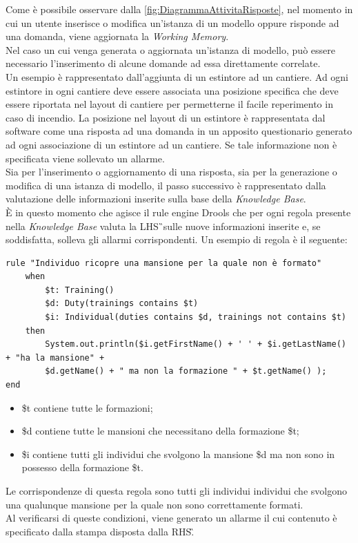Come è possibile osservare dalla \autoref{fig:DiagrammaAttivitaRisposte}, nel momento in cui un utente inserisce o modifica un'istanza di un modello oppure risponde ad una domanda, viene aggiornata la \textit{Working Memory}. \\
Nel caso un cui venga generata o aggiornata un'istanza di modello, può essere necessario l'inserimento di alcune domande ad essa direttamente correlate.\\
Un esempio è rappresentato dall'aggiunta di un estintore ad un cantiere. Ad ogni estintore in ogni cantiere deve essere associata una posizione specifica che deve essere riportata nel layout di cantiere per permetterne il facile reperimento in caso di incendio. La posizione nel layout di un estintore è rappresentata dal software come una risposta ad una domanda in un apposito questionario generato ad ogni associazione di un estintore ad un cantiere. Se tale informazione non è specificata viene sollevato un allarme.\\
Sia per l'inserimento o aggiornamento di una risposta, sia per la generazione o modifica di una istanza di modello, il passo successivo è rappresentato dalla valutazione delle informazioni inserite sulla base della \textit{Knowledge Base}. \\
È in questo momento che agisce il rule engine Drools che per ogni regola presente nella \textit{Knowledge Base} valuta la \gls{LHS}\G\ sulle nuove informazioni inserite e, se soddisfatta, solleva gli allarmi corrispondenti. 
Un esempio di regola è il seguente:


\begin{verbatim}
rule "Individuo ricopre una mansione per la quale non è formato"
	when
		$t: Training()
		$d: Duty(trainings contains $t)
		$i: Individual(duties contains $d, trainings not contains $t)
	then
		System.out.println($i.getFirstName() + ' ' + $i.getLastName() + "ha la mansione" +
		$d.getName() + " ma non la formazione " + $t.getName() );
end
\end{verbatim}
\begin{itemize}
	\item \$t contiene tutte le formazioni;
	\item \$d contiene  tutte le mansioni che necessitano della formazione \$t;
	\item \$i contiene tutti gli individui che svolgono la mansione \$d ma non sono in possesso della formazione \$t.
\end{itemize}
Le corrispondenze di questa regola sono tutti gli individui individui che svolgono una qualunque mansione per la quale non sono correttamente formati.\\
Al verificarsi di queste condizioni, viene generato un allarme il cui contenuto è specificato dalla stampa disposta dalla \gls{RHS}\G.



